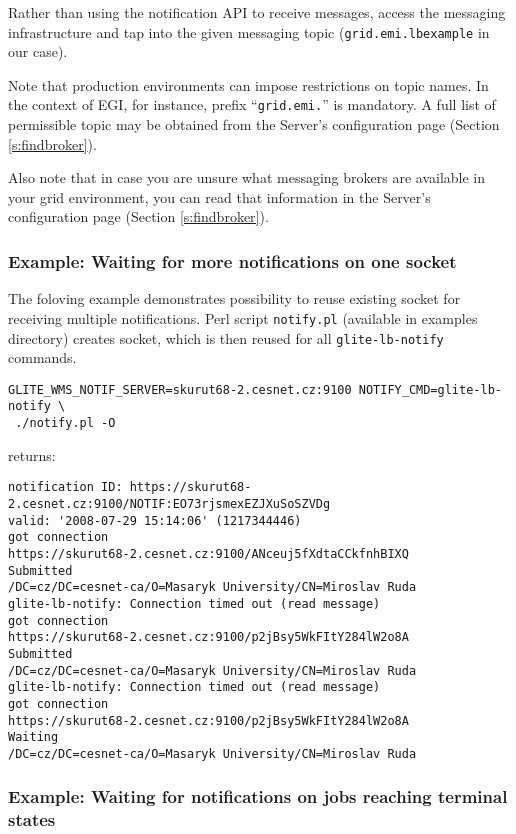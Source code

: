 Rather than using the \LB notification API to receive messages, access the messaging infrastructure and tap into the given messaging topic (\texttt{grid.emi.lbexample} in our case).

Note that production environments can impose restrictions on topic names. In the context of EGI, for instance, prefix ``\texttt{grid.emi.}'' is mandatory. A full list of permissible topic may be obtained from the \LB Server's configuration page (Section \ref{s:findbroker}).

Also note that in case you are unsure what messaging brokers are available in your grid environment, you can read that information in the \LB Server's configuration page (Section \ref{s:findbroker}).

\subsubsection{Example: Waiting for more notifications on one socket}

The foloving example demonstrates possibility to reuse existing socket for receiving
multiple notifications. Perl script \verb'notify.pl' (available in 
examples directory) creates socket, which is then reused for all
\verb'glite-lb-notify' commands.

\begin{verbatim}
GLITE_WMS_NOTIF_SERVER=skurut68-2.cesnet.cz:9100 NOTIFY_CMD=glite-lb-notify \
 ./notify.pl -O
\end{verbatim}

returns:

\begin{verbatim}
notification ID: https://skurut68-2.cesnet.cz:9100/NOTIF:EO73rjsmexEZJXuSoSZVDg
valid: '2008-07-29 15:14:06' (1217344446)
got connection
https://skurut68-2.cesnet.cz:9100/ANceuj5fXdtaCCkfnhBIXQ        Submitted
/DC=cz/DC=cesnet-ca/O=Masaryk University/CN=Miroslav Ruda
glite-lb-notify: Connection timed out (read message)
got connection
https://skurut68-2.cesnet.cz:9100/p2jBsy5WkFItY284lW2o8A        Submitted
/DC=cz/DC=cesnet-ca/O=Masaryk University/CN=Miroslav Ruda
glite-lb-notify: Connection timed out (read message)
got connection
https://skurut68-2.cesnet.cz:9100/p2jBsy5WkFItY284lW2o8A        Waiting
/DC=cz/DC=cesnet-ca/O=Masaryk University/CN=Miroslav Ruda
\end{verbatim}


\subsubsection{Example: Waiting for notifications on jobs reaching terminal states}

